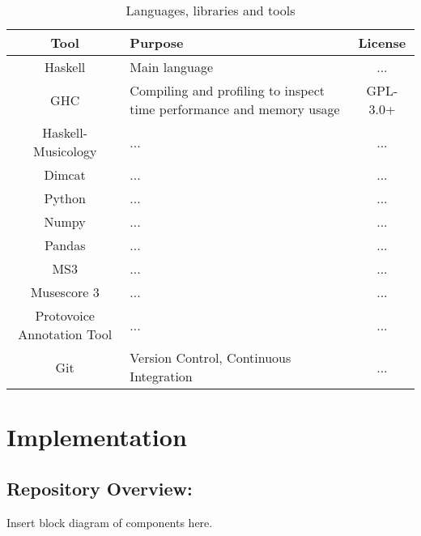 \documentclass[12pt,a4paper,twoside,openright]{report}
\begin{document}
\begin{table}
  {
  \small
  \caption{Languages, libraries and tools}
  \label{Languages}
  \begin{center}
    \begin{tabularx}{.9\textwidth}{cXc}
      Tool & Purpose & License \\
      \toprule
      Haskell & Main language & ... \\
      \midrule
      GHC & Compiling and profiling to inspect time performance and memory usage  & GPL-3.0+ \\
      \midrule
      Haskell-Musicology & ... & ... \\
      \midrule
      Dimcat & ... & ... \\
      \midrule
      Python & ... & ... \\
      \midrule
      Numpy & ... & ... \\
      \midrule
      Pandas & ... & ... \\
      \midrule
      MS3 & ... & ... \\
      \midrule
      Musescore 3 & ... & ... \\
      \midrule
      Protovoice Annotation Tool & ... & ... \\
      \midrule
      Git & Version Control, Continuous Integration & ... \\
      \bottomrule
    \end{tabularx}
  \end{center}
  }
\end{table}


\chapter{Implementation}

\section{Repository Overview:}

Insert block diagram of components here.

\vspace{50\baselineskip}

\DTsetlength{0em}{1.3em}{0em}{0.7pt}{3pt}       
\setlength{\DTbaselineskip}{15pt}  %
\renewcommand{\DTstyle}{\ttfamily}
\end{document}
